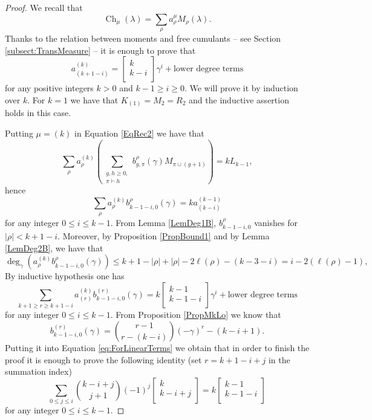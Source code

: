 \documentclass[11pt]{amsart}
\theoremstyle{plain}
\theoremstyle{remark}
\DeclareMathOperator{\Ch}{Ch}
\begin{document}
\begin{proof}
We recall that
\[ \Ch_\mu(\lambda) = \sum_\rho a_\rho^\mu M_\rho(\lambda).\]
Thanks to the relation between moments and free cumulants -- see Section \ref{subsect:TransMeasure} -- it is enough to prove that 
$$a^{(k)}_{(k+1-i)} = \left[ \begin{matrix} k\\ k-i\\
\end{matrix} \right] \gamma^i
+ \text{lower degree terms}$$
for any positive integers $k > 0$
and $k-1 \geq i \geq 0$. We will prove it by induction over $k$. For $k=1$ we have
that $K_{(1)} = M_2 = R_2$ and the inductive assertion holds in this case. 

Putting $\mu = (k)$ in Equation \eqref{EqRec2} we have that
$$\sum_\rho a^{(k)}_\rho \left( \sum_{\substack{g,h \geq 0, \\ \pi \vdash h}}
b_{g,\pi}^\rho(\gamma) M_{\pi \cup (g+1)}  \right) = k L_{k-1},$$
hence
$$\sum_\rho a^{(k)}_\rho b_{k-1-i,0}^\rho(\gamma) = k a^{(k-1)}_{(k-i)}$$
for any integer $0 \leq i \leq k-1$.
From Lemma
\ref{LemDeg1B}, $b_{k-1-i,0}^\rho$ vanishes for $|\rho| < k+1-i$.
Moreover, by Proposition \ref{PropBound1} and by Lemma
\ref{LemDeg2B}, we have that
$$\deg_\gamma(a^{(k)}_\rho b_{k-1-i,0}^\rho(\gamma)) \leq k + 1 - |\rho| + |\rho| -
2\ell(\rho) - (k-3-i)= i - 2(\ell(\rho)-1),$$
By inductive hypothesis one has
\begin{equation}
\label{eq:ForLinearTerms}
\sum_{k+1 \geq r \geq k+1-i} a^{(k)}_{(r)} b_{k-1-i,0}^{(r)}(\gamma) = k \left[
\begin{matrix} k-1\\ k-1-i\\
\end{matrix} \right] \gamma^i
+ \text{lower degree terms}
\end{equation}
for any integer $0 \leq i \leq k-1$.
From Proposition \ref{PropMkLo} we know that
$$b_{k-1-i,0}^{(r)}(\gamma) = \binom{r-1}{r-(k-i)}(-\gamma)^r-(k-i+1).$$
Putting it into Equation \eqref{eq:ForLinearTerms} we obtain that in order to
finish the proof it is enough to prove the following identity
(set $r=k+1-i+j$ in the summation index)
$$\sum_{0 \leq j \leq i}\binom{k-i+j}{j+1}(-1)^j \left[ \begin{matrix} k\\
k-i+j\\
\end{matrix} \right] = k\left[ \begin{matrix} k-1\\ k-1-i\\
\end{matrix} \right]$$
for any integer $0 \leq i \leq k-1$.



\end{proof}
\end{document}
